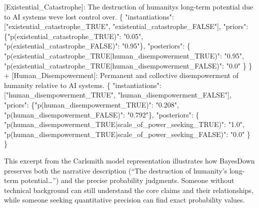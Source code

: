 \documentclass[
  11pt,
  letterpaper,
]{book}
\newenvironment{Shaded}{\begin{snugshade}}{\end{snugshade}}
\newcommand{\DataTypeTok}[1]{\textcolor[rgb]{0.68,0.00,0.00}{#1}}
\newcommand{\ErrorTok}[1]{\textcolor[rgb]{0.68,0.00,0.00}{#1}}
\newcommand{\FunctionTok}[1]{\textcolor[rgb]{0.28,0.35,0.67}{#1}}
\newcommand{\OtherTok}[1]{\textcolor[rgb]{0.00,0.23,0.31}{#1}}
\newcommand{\StringTok}[1]{\textcolor[rgb]{0.13,0.47,0.30}{#1}}
\begin{document}
\begin{landscape}
\begin{Shaded}
\begin{Highlighting}[]
\OtherTok{[}\ErrorTok{Existential\_Catastrophe}\OtherTok{]}\ErrorTok{:} \ErrorTok{The} \ErrorTok{destruction} \ErrorTok{of} \ErrorTok{humanity\textquotesingle{}s} \ErrorTok{long{-}term} \ErrorTok{potential} \ErrorTok{due} \ErrorTok{to} \ErrorTok{AI} \ErrorTok{systems} \ErrorTok{we\textquotesingle{}ve} \ErrorTok{lost} \ErrorTok{control} \ErrorTok{over.} \FunctionTok{\{}
  \DataTypeTok{"instantiations"}\FunctionTok{:} \OtherTok{[}\StringTok{"existential\_catastrophe\_TRUE"}\OtherTok{,} \StringTok{"existential\_catastrophe\_FALSE"}\OtherTok{]}\FunctionTok{,}
  \DataTypeTok{"priors"}\FunctionTok{:} \FunctionTok{\{}\DataTypeTok{"p(existential\_catastrophe\_TRUE)"}\FunctionTok{:} \StringTok{"0.05"}\FunctionTok{,} \DataTypeTok{"p(existential\_catastrophe\_FALSE)"}\FunctionTok{:} \StringTok{"0.95"}\FunctionTok{\},}
  \DataTypeTok{"posteriors"}\FunctionTok{:} \FunctionTok{\{}
    \DataTypeTok{"p(existential\_catastrophe\_TRUE|human\_disempowerment\_TRUE)"}\FunctionTok{:} \StringTok{"0.95"}\FunctionTok{,}
    \DataTypeTok{"p(existential\_catastrophe\_TRUE|human\_disempowerment\_FALSE)"}\FunctionTok{:} \StringTok{"0.0"}
  \FunctionTok{\}}
\FunctionTok{\}}
 \ErrorTok{+} \OtherTok{[}\ErrorTok{Human\_Disempowerment}\OtherTok{]}\ErrorTok{:} \ErrorTok{Permanent} \ErrorTok{and} \ErrorTok{collective} \ErrorTok{disempowerment} \ErrorTok{of} \ErrorTok{humanity} \ErrorTok{relative} \ErrorTok{to} \ErrorTok{AI} \ErrorTok{systems.} \FunctionTok{\{}
   \DataTypeTok{"instantiations"}\FunctionTok{:} \OtherTok{[}\StringTok{"human\_disempowerment\_TRUE"}\OtherTok{,} \StringTok{"human\_disempowerment\_FALSE"}\OtherTok{]}\FunctionTok{,}
   \DataTypeTok{"priors"}\FunctionTok{:} \FunctionTok{\{}\DataTypeTok{"p(human\_disempowerment\_TRUE)"}\FunctionTok{:} \StringTok{"0.208"}\FunctionTok{,} \DataTypeTok{"p(human\_disempowerment\_FALSE)"}\FunctionTok{:} \StringTok{"0.792"}\FunctionTok{\},}
   \DataTypeTok{"posteriors"}\FunctionTok{:} \FunctionTok{\{}
     \DataTypeTok{"p(human\_disempowerment\_TRUE|scale\_of\_power\_seeking\_TRUE)"}\FunctionTok{:} \StringTok{"1.0"}\FunctionTok{,}
     \DataTypeTok{"p(human\_disempowerment\_TRUE|scale\_of\_power\_seeking\_FALSE)"}\FunctionTok{:} \StringTok{"0.0"}
   \FunctionTok{\}}
 \FunctionTok{\}}
\end{Highlighting}
\end{Shaded}

This excerpt from the Carlsmith model representation illustrates how
BayesDown preserves both the narrative description (``The destruction of
humanity's long-term potential\ldots{}'') and the precise probability
judgments. Someone without technical background can still understand the
core claims and their relationships, while someone seeking quantitative
precision can find exact probability values.


\end{landscape}
\end{document}
